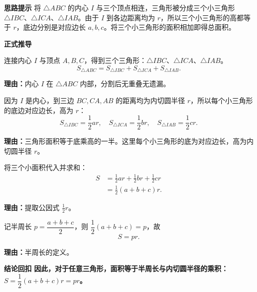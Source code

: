 \begin{proofbox}
	\textbf{\textcolor{CProof}{思路提示}}
	将 $\triangle ABC$ 的内心 $I$ 与三个顶点相连，三角形被分成三个小三角形 $\triangle IBC$、$\triangle ICA$、$\triangle IAB$。由于 $I$ 到各边距离均为 $r$，所以三个小三角形的高都等于 $r$，底边分别是对应边长 $a,b,c$。将三个小三角形的面积相加即得总面积。

	\medskip
	\textbf{\textcolor{CProof}{正式推导}}
	\begin{description}[style=nextline, leftmargin=2.8em, labelsep=0.5em, itemsep=0.55em]
		\item[\textbf{步骤一（分割图形）：}]
			连接内心 $I$ 与顶点 $A,B,C$，得到三个三角形：$\triangle IBC$、$\triangle ICA$、$\triangle IAB$。
			\[
				S_{\triangle ABC} = S_{\triangle IBC} + S_{\triangle ICA} + S_{\triangle IAB}.
			\]
			\par\textbf{理由：}内心 $I$ 在 $\triangle ABC$ 内部，分割后无重叠无遗漏。
		\item[\textbf{步骤二（计算小面积）：}]
			因为 $I$ 是内心，到三边 $BC, CA, AB$ 的距离均为内切圆半径 $r$，所以每个小三角形的底边对应边长，高为 $r$：
			\[
				S_{\triangle IBC} = \frac{1}{2} a r,\quad S_{\triangle ICA} = \frac{1}{2} b r,\quad S_{\triangle IAB} = \frac{1}{2} c r.
			\]
			\par\textbf{理由：}三角形面积等于底乘高的一半。这里每个小三角形的底为对应边长，高为内切圆半径 $r$。
		\item[\textbf{步骤三（求和化简）：}]
			将三个小面积代入并求和：
			\[
				\begin{aligned}
					S &= \frac{1}{2} a r + \frac{1}{2} b r + \frac{1}{2} c r\\&= \frac{1}{2} (a+b+c) r.
			\end{aligned}
			\]
			\par\textbf{理由：}提取公因式 $\frac{1}{2} r$。
		\item[\textbf{步骤四（引入半周长）：}]
			记半周长 $p = \dfrac{a+b+c}{2}$，则 $\dfrac{1}{2}(a+b+c) = p$，故
			\[
				S = p r.
			\]
			\par\textbf{理由：}半周长的定义。
	\end{description}

	\medskip
	\textbf{\textcolor{CProof}{结论回扣}}
	\textbf{因此，对于任意三角形，面积等于半周长与内切圆半径的乘积：$S = \dfrac{1}{2}(a+b+c)r = pr$。}
\end{proofbox}
